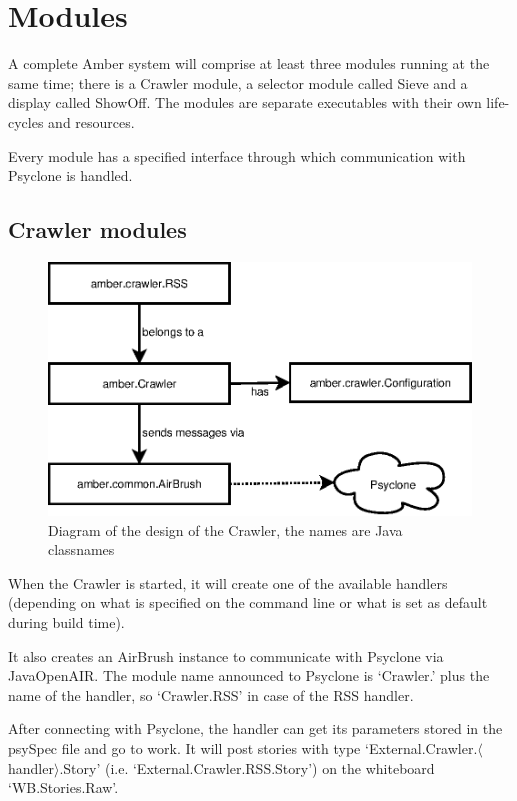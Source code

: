 \section{\label{sct:modules}Modules}

A complete Amber system will comprise at least three modules running at the
same time; there is a Crawler module, a selector module called Sieve and a
display called ShowOff. The modules are separate executables with their own
life-cycles and resources.

Every module has a specified interface through which communication with
Psyclone is handled.

\subsection{Crawler modules}

\begin{figure}
    \centering
    \includegraphics{image/crawler}
    \caption{Diagram of the design of the Crawler, the names are Java classnames}
\end{figure}

When the Crawler is started, it will create one of the available handlers
(depending on what is specified on the command line or what is set as default
during build time). 

It also creates an AirBrush instance to communicate with Psyclone via
Java\-Open\-AIR. The module name announced to Psyclone is `Crawler.' plus the
name of the handler, so `Crawler.RSS' in case of the RSS handler.

After connecting with Psyclone, the handler can get its parameters stored in
the psySpec file and go to work. It will post stories with type
`External.Crawler.$\langle$handler$\rangle$.Story' (i.e.
`External.Crawler.RSS.Story') on the whiteboard `WB.Stories.Raw'.

